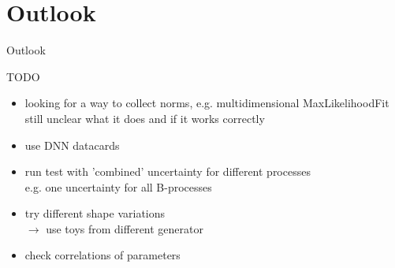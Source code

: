 \section{Outlook}
\begin{frame}{Outlook}

\begin{block}{TODO}
\begin{itemize}
\item looking for a way to collect norms, e.g. multidimensional MaxLikelihoodFit\\
\rar still unclear what it does and if it works correctly
\item use DNN datacards
\item run test with 'combined' uncertainty for different processes\\
\rar e.g. one uncertainty for all B-processes
\item try different shape variations\\
$\rightarrow$ use toys from different generator
\item check correlations of parameters
\end{itemize}
\end{block}

\end{frame}
